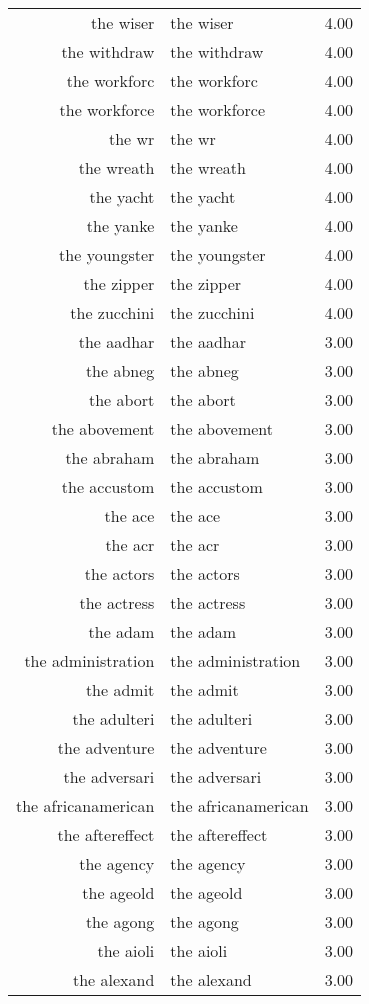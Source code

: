 \begin{table}[ht]
\begin{tabular}{rlr}
  the wiser & the wiser & 4.00 \\ 
  the withdraw & the withdraw & 4.00 \\ 
  the workforc & the workforc & 4.00 \\ 
  the workforce & the workforce & 4.00 \\ 
  the wr & the wr & 4.00 \\ 
  the wreath & the wreath & 4.00 \\ 
  the yacht & the yacht & 4.00 \\ 
  the yanke & the yanke & 4.00 \\ 
  the youngster & the youngster & 4.00 \\ 
  the zipper & the zipper & 4.00 \\ 
  the zucchini & the zucchini & 4.00 \\ 
  the aadhar & the aadhar & 3.00 \\ 
  the abneg & the abneg & 3.00 \\ 
  the abort & the abort & 3.00 \\ 
  the abovement & the abovement & 3.00 \\ 
  the abraham & the abraham & 3.00 \\ 
  the accustom & the accustom & 3.00 \\ 
  the ace & the ace & 3.00 \\ 
  the acr & the acr & 3.00 \\ 
  the actors & the actors & 3.00 \\ 
  the actress & the actress & 3.00 \\ 
  the adam & the adam & 3.00 \\ 
  the administration & the administration & 3.00 \\ 
  the admit & the admit & 3.00 \\ 
  the adulteri & the adulteri & 3.00 \\ 
  the adventure & the adventure & 3.00 \\ 
  the adversari & the adversari & 3.00 \\ 
  the africanamerican & the africanamerican & 3.00 \\ 
  the aftereffect & the aftereffect & 3.00 \\ 
  the agency & the agency & 3.00 \\ 
  the ageold & the ageold & 3.00 \\ 
  the agong & the agong & 3.00 \\ 
  the aioli & the aioli & 3.00 \\ 
  the alexand & the alexand & 3.00 \\ 

\end{tabular}
\end{table}
